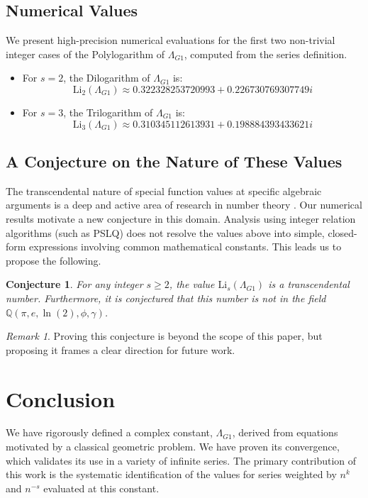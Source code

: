 \documentclass{amsart}
\theoremstyle{plain}
\newtheorem{conjecture}[theorem]{Conjecture}
\theoremstyle{definition}
\theoremstyle{remark}
\newtheorem*{remark}{Remark}
\newcommand{\LambdaG}{\Lambda_{G1}}
\begin{document}
\subsection{Numerical Values}
We present high-precision numerical evaluations for the first two non-trivial integer cases of the Polylogarithm of $\LambdaG$, computed from the series definition.
\begin{itemize}
    \item For $s=2$, the Dilogarithm of $\LambdaG$ is:
    $$ \mathrm{Li}_2(\LambdaG) \approx 0.322328253720993 + 0.226730769307749i $$
    \item For $s=3$, the Trilogarithm of $\LambdaG$ is:
    $$ \mathrm{Li}_3(\LambdaG) \approx 0.310345112613931 + 0.198884393433621i $$
\end{itemize}

\subsection{A Conjecture on the Nature of These Values}
The transcendental nature of special function values at specific algebraic arguments is a deep and active area of research in number theory \cite{Lewin}. Our numerical results motivate a new conjecture in this domain. Analysis using integer relation algorithms (such as PSLQ) does not resolve the values above into simple, closed-form expressions involving common mathematical constants. This leads us to propose the following.

\begin{conjecture}
For any integer $s \ge 2$, the value $\mathrm{Li}_s(\LambdaG)$ is a transcendental number. Furthermore, it is conjectured that this number is not in the field $\mathbb{Q}(\pi, e, \ln(2), \phi, \gamma)$.
\end{conjecture}
\begin{remark}
Proving this conjecture is beyond the scope of this paper, but proposing it frames a clear direction for future work.
\end{remark}

\section{Conclusion}
We have rigorously defined a complex constant, $\LambdaG$, derived from equations motivated by a classical geometric problem. We have proven its convergence, which validates its use in a variety of infinite series. The primary contribution of this work is the systematic identification of the values for series weighted by $n^k$ and $n^{-s}$ evaluated at this constant.
\end{document}

